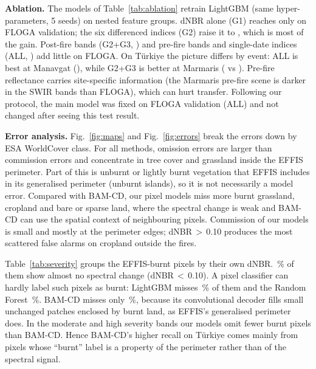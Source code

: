 \textbf{Ablation.} The models of Table~\ref{tab:ablation} retrain LightGBM (same hyper-parameters,
5 seeds) on nested feature groups. dNBR alone (G1) reaches only \AblGOneVal{} on FLOGA validation; the six
differenced indices (G2) raise it to \AblGTwoVal{}, which is most of the gain. Post-fire bands (G2+G3,
\AblGTwoThreeVal) and pre-fire bands and single-date indices (ALL, \AblAllVal) add little on FLOGA. On Türkiye the
picture differs by event: ALL is best at Manavgat (\FoneLgbmManavgat), while G2+G3 is better at Marmaris
(\FoneAblGTwoThreeMarmaris{} vs \FoneLgbmMarmaris). Pre-fire reflectance carries site-specific information (the
Marmaris pre-fire scene is darker in the SWIR bands than FLOGA), which can hurt transfer. Following our protocol, the
main model was fixed on FLOGA validation (ALL) and not changed after seeing this test result.

\begin{table}[t]
\centering
\caption{Feature ablation (LightGBM, F1, mean$\pm$std over 5 seeds). G1: dNBR; G2: six differenced indices;
G3: post-fire bands; ALL: G2+G3+pre-fire bands+single-date indices.}\label{tab:ablation}
\resizebox{\columnwidth}{!}{}
\end{table}

\textbf{Error analysis.} Fig.~\ref{fig:maps} and Fig.~\ref{fig:errors} break the errors down by ESA WorldCover
class. For all methods, omission errors are larger than commission errors and concentrate in tree cover and
grassland inside the EFFIS perimeter. Part of this is unburnt or lightly burnt vegetation that EFFIS includes in
its generalised perimeter (unburnt islands), so it is not necessarily a model error. Compared with BAM-CD, our
pixel models miss more burnt grassland, cropland and bare or sparse land, where the spectral change is weak and
BAM-CD can use the spatial context of neighbouring pixels. Commission of our models is small and mostly at the
perimeter edges; dNBR\,$>$\,0.10 produces the most scattered false alarms on cropland outside the fires.

Table~\ref{tab:severity} groups the EFFIS-burnt pixels by their own dNBR. \SevShareUnchanged\,\% of them show
almost no spectral change (dNBR\,$<$\,0.10). A pixel classifier can hardly label such pixels as burnt: LightGBM
misses \SevOmitUnchangedLgbm\,\% of them and the Random Forest \SevOmitUnchangedRf\,\%. BAM-CD misses only
\SevOmitUnchangedBamcdOne\,\%, because its convolutional decoder fills small unchanged patches enclosed by burnt
land, as EFFIS's generalised perimeter does. In the moderate and high severity bands our models omit fewer
burnt pixels than BAM-CD. Hence BAM-CD's higher recall on Türkiye comes mainly from pixels whose ``burnt'' label is
a property of the perimeter rather than of the spectral signal.




